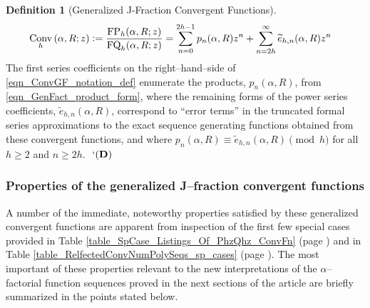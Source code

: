 \documentclass[12pt,reqno]{article}
\numberwithin{sfootnote}{section}
\newcommand{\tableref}[1]{Table \ref{#1} (page \pageref{#1})}
\numberwithin{equation}{section}
\theoremstyle{DefaultTheoremStyle}
\theoremstyle{definition}
\newtheorem{definition}[theorem]{Definition}
\newcommand{\eolqedsymbol}[1]{{\hrulefill\ensuremath{\ #1}}}
\renewcommand{\eolqedsymbol}[1]{{\mboxfill{ }\ensuremath{\ #1}}}
\newcommand{\DefinitionQEDSymbol}{`(\text{\rm{\bf D}})}
\newcommand{\DefinitionQED}{\eolqedsymbol{\DefinitionQEDSymbol}}
\newcommand{\quotetext}[1]{``#1''}
\newcommand{\defequals}{\ensuremath{\vcentcolon=}}
\newcommand{\pn}[3]{\ensuremath{p_{#1}\left(#2, #3\right)}}
\newcommand{\ConvGF}[4]{\ensuremath{\Conv_{#1}\left(#2, #3; #4\right)}}
\DeclareMathOperator{\FP}{FP}
\DeclareMathOperator{\FQ}{FQ}
\DeclareMathOperator{\Conv}{Conv}
\begin{document}
\begin{definition}[Generalized J-Fraction Convergent Functions]
\begin{align}
\label{eqn_ConvGF_notation_def} 
\ConvGF{h}{\alpha}{R}{z} & \defequals 
     \frac{\FP_h(\alpha, R; z)}{\FQ_h(\alpha, R; z)} = 
     \sum_{n=0}^{2h-1} p_n(\alpha, R) z^n + 
     \sum_{n=2h}^{\infty} \widetilde{e}_{h,n}(\alpha, R) z^n 
\end{align} 
The first series coefficients on the right--hand--side of 
\eqref{eqn_ConvGF_notation_def} enumerate the products, 
$p_n(\alpha, R)$, from \eqref{eqn_GenFact_product_form}, where the 
remaining forms of the power series coefficients, 
$\widetilde{e}_{h,n}(\alpha, R)$, 
correspond to \quotetext{error terms} in the 
truncated formal series approximations to the 
exact sequence generating functions 
obtained from these convergent functions, and where 
$\pn{n}{\alpha}{R} \equiv \widetilde{e}_{h,n}(\alpha, R) \pmod{h}$ 
for all $h \geq 2$ and $n \geq 2h$. 
\DefinitionQED 
\end{definition} 

\subsubsection{Properties of the generalized J--fraction convergent functions} 

A number of the immediate, noteworthy properties satisfied by these 
generalized convergent functions 
are apparent from inspection of the first few special cases provided in 
\tableref{table_SpCase_Listings_Of_PhzQhz_ConvFn} and in 
\tableref{table_RelfectedConvNumPolySeqs_sp_cases}. 
The most important of these properties relevant 
to the new interpretations of the 
$\alpha$--factorial function sequences proved in the next sections of the 
article are briefly summarized in the points stated below. 
\end{document}
